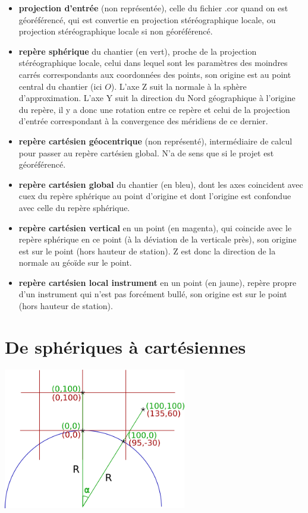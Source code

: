 \documentclass[french]{report}
\begin{document}
\begin{itemize}
\item \textbf{projection d'entrée} (non représentée), celle du fichier .cor quand on est géoréférencé, qui est convertie en projection stéréographique locale, ou projection stéréographique locale si non géoréférencé.
\item \textbf{repère sphérique} du chantier (en vert), proche de la projection stéréographique locale, celui dans lequel sont les paramètres des moindres carrés correspondants aux coordonnées des points, son origine est au point central du chantier (ici $O$). L'axe Z suit la normale à la sphère d'approximation. L'axe Y suit la direction du Nord géographique à l'origine du repère, il y a donc une rotation entre ce repère et celui de la projection d'entrée correspondant à la convergence des méridiens de ce dernier.
\item \textbf{repère cartésien géocentrique} (non représenté), intermédiaire de calcul pour passer au repère cartésien global. N'a de sens que si le projet est géoréférencé.
\item \textbf{repère cartésien global} du chantier (en bleu), dont les axes coincident avec cuex du repère sphérique au point d'origine et dont l'origine est confondue avec celle du repère sphérique.
\item \textbf{repère cartésien vertical} en un point (en magenta), qui coincide avec le repère sphérique en ce point (à la déviation de la verticale près), son origine est sur le point (hors hauteur de station). Z est donc la direction de la normale au géoïde sur le point.
\item \textbf{repère cartésien local instrument} en un point (en jaune), repère propre d'un instrument qui n'est pas forcément bullé, son origine est sur le point (hors hauteur de station).
\end{itemize}



\section{De sphériques à cartésiennes}

\begin{center}
\includegraphics[width = 8cm]{images/coord_spher_cart}
\end{center}
\end{document}
